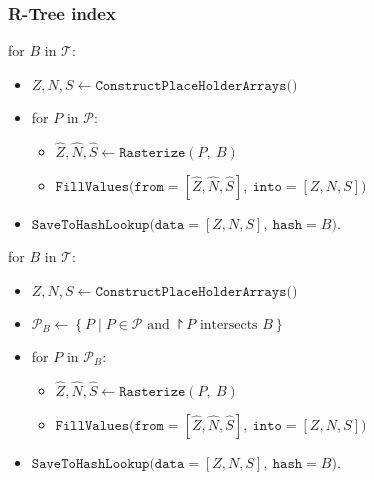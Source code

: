 \subsubsection{R-Tree index}

\begin{leftbar}
for $B$ in $\mathcal{T}$:
  \begin{itemize}[nosep,label=]
    \item $Z, N, S \leftarrow \texttt{ConstructPlaceHolderArrays()}$
    \item for $P$ in $\mathcal{P}$:
    \begin{itemize}[nosep,label=]
      \item $\hat{Z}, \hat{N}, \hat{S} \leftarrow \texttt{Rasterize}(P,~B)$
      \item $\texttt{FillValues(from}=[\hat{Z}, \hat{N}, \hat{S}],~\texttt{into}=[Z, N, S])$
    \end{itemize}
  \item $\texttt{SaveToHashLookup(data}=[Z, N, S],~\texttt{hash}=B)$.
  \end{itemize}
\end{leftbar}

\begin{leftbar}
for $B$ in $\mathcal{T}$:
  \begin{itemize}[nosep,label=]
    \item $Z, N, S \leftarrow \texttt{ConstructPlaceHolderArrays()}$
    \item $\mathcal{P}_B \leftarrow \left\{P \mid P \in \mathcal{P} \text{ and } \project{P} \text{ intersects } B \right\}$
    \item for $P$ in $\mathcal{P}_B$:
    \begin{itemize}[nosep,label=]
      \item $\hat{Z}, \hat{N}, \hat{S} \leftarrow \texttt{Rasterize}(P,~B)$
      \item $\texttt{FillValues(from}=[\hat{Z}, \hat{N}, \hat{S}],~\texttt{into}=[Z, N, S])$
    \end{itemize}
  \item $\texttt{SaveToHashLookup(data}=[Z, N, S],~\texttt{hash}=B)$.
  \end{itemize}
\end{leftbar}

